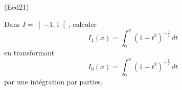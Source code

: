 \begin{tiny}(Eed21)\end{tiny} Dans $I = \left] -1, 1\right[$, calculer 
\begin{displaymath}
 I_1(x) = \int_0^x (1 - t^2)^{-\frac{3}{2}}\, dt
\end{displaymath}
en transformant
\begin{displaymath}
 I_0(x) = \int_0^x (1 - t^2)^{-\frac{1}{2}}\, dt
\end{displaymath}
par une intégration par parties.